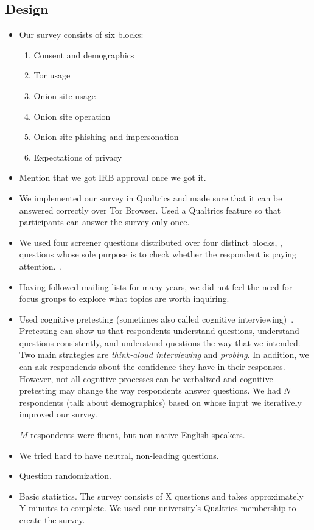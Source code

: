 \subsection{Design}
\begin{itemize}
    \item Our survey consists of six blocks:
        \begin{enumerate}
            \item Consent and demographics
            \item Tor usage
            \item Onion site usage
            \item Onion site operation
            \item Onion site phishing and impersonation
            \item Expectations of privacy
        \end{enumerate}
    \item Mention that we got IRB approval once we got it.
    \item We implemented our survey in Qualtrics and made sure that it can be
        answered correctly over Tor Browser.  Used a Qualtrics feature so that
        participants can answer the survey only once.
    \item We used four screener questions distributed over four distinct
        blocks, \ie, questions whose sole purpose is to check whether the
        respondent is paying attention.~\cite{Berinsky2014a}.
    \item Having followed mailing lists \etc for many years, we did not feel the
        need for focus groups to explore what topics are worth inquiring.
    \item Used cognitive pretesting (sometimes also called cognitive
        interviewing)~\cite{Collins2003a}.  Pretesting can show us that
        respondents \first understand questions, \second understand questions
        consistently, and \third understand questions the way that we intended.
        Two main strategies are \emph{think-aloud interviewing} and
        \emph{probing}.  In addition, we can ask respondends about the
        confidence they have in their responses.  However, not all cognitive
        processes can be verbalized and cognitive pretesting may change the way
        respondents answer questions.  We had $N$ respondents (talk about
        demographics) based on whose input we iteratively improved our survey.

        $M$ respondents were fluent, but non-native English speakers.
    \item We tried hard to have neutral, non-leading questions.
    \item Question randomization.
    \item Basic statistics.  The survey consists of X questions and takes
        approximately Y minutes to complete.  We used our university's
        Qualtrics membership to create the survey.
\end{itemize}

